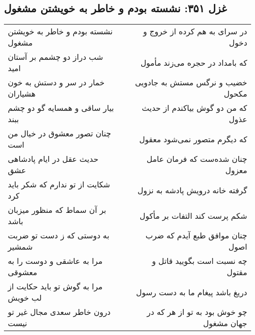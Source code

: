 \begin{center}
\section*{غزل ۳۵۱: نشسته بودم و خاطر به خویشتن مشغول}
\label{sec:351}
\begin{longtable}{l p{0.5cm} r}
نشسته بودم و خاطر به خویشتن مشغول
&&
در سرای به هم کرده از خروج و دخول
\\
شب دراز دو چشمم بر آستان امید
&&
که بامداد در حجره می‌زند مأمول
\\
خمار در سر و دستش به خون هشیاران
&&
خضیب و نرگس مستش به جادویی مکحول
\\
بیار ساقی و همسایه گو دو چشم ببند
&&
که من دو گوش بیاکندم از حدیث عذول
\\
چنان تصور معشوق در خیال من است
&&
که دیگرم متصور نمی‌شود معقول
\\
حدیث عقل در ایام پادشاهی عشق
&&
چنان شده‌ست که فرمان عامل معزول
\\
شکایت از تو ندارم که شکر باید کرد
&&
گرفته خانه درویش پادشه به نزول
\\
بر آن سماط که منظور میزبان باشد
&&
شکم پرست کند التفات بر مأکول
\\
به دوستی که ز دست تو ضربت شمشیر
&&
چنان موافق طبع آیدم که ضرب اصول
\\
مرا به عاشقی و دوست را به معشوقی
&&
چه نسبت است بگویید قاتل و مقتول
\\
مرا به گوش تو باید حکایت از لب خویش
&&
دریغ باشد پیغام ما به دست رسول
\\
درون خاطر سعدی مجال غیر تو نیست
&&
چو خوش بود به تو از هر که در جهان مشغول
\\
\end{longtable}
\end{center}

